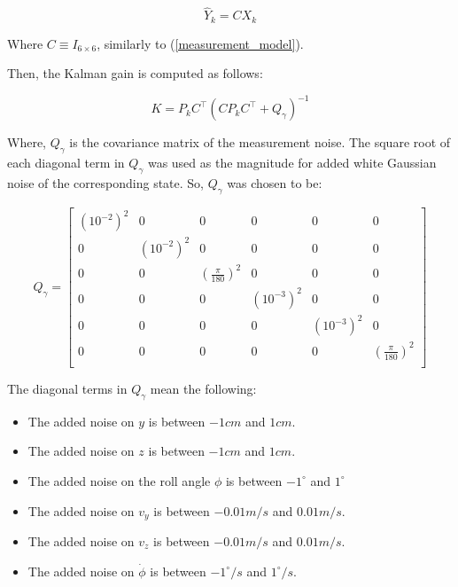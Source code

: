 \documentclass{thesisreport}
\begin{document}
	\begin{equation}
        \hat{Y}_k = C X_k 
    \end{equation}
    
    Where $C \equiv	I_{6 \times 6}$, similarly to (\ref{measurement_model}).

Then, the Kalman gain is computed as follows:

\begin{equation}
        K = P_k C^{\intercal} (C P_k C^{\intercal} + Q_{\gamma})^{-1}
    \end{equation}

Where, $Q_{\gamma}$ is the covariance matrix of the measurement noise. The square root of each diagonal term in $Q_{\gamma}$ was used as the magnitude for added white Gaussian noise of the corresponding state. So, $Q_{\gamma}$ was chosen to be:

 \begin{equation}
        Q_{\gamma} = \begin{bmatrix}
                (10^{-2})^2 & 0 & 0 & 0  & 0 & 0 \\
                0 & (10^{-2})^2 & 0 & 0  & 0 & 0 \\
                0 & 0 & (\frac{\pi}{180})^2 & 0 & 0 & 0 \\
                0 & 0 & 0 & (10^{-3})^2 & 0 & 0 \\
                0 & 0 & 0 & 0 & (10^{-3})^2 & 0 \\
                0 & 0 & 0 & 0 & 0 & (\frac{\pi}{180})^2 \\
            \end{bmatrix}
\end{equation}

The diagonal terms in $Q_{\gamma}$ mean the following:

\begin{itemize}
	\item The added noise on $y$ is between $-1cm$ and $1cm$.
	\item The added noise on $z$ is between $-1cm$ and $1cm$.
	\item The added noise on the roll angle $\phi$ is between $-1^{\circ}$ and $1^{\circ}$
	\item The added noise on $v_y$ is between $-0.01m/s$ and $0.01m/s$.
	\item The added noise on $v_z$ is between $-0.01m/s$ and $0.01m/s$.
	\item The added noise on $\dot{\phi}$ is between $-1^{\circ}/s$ and $1^{\circ}/s$.
\end{itemize}
    
\end{document}

